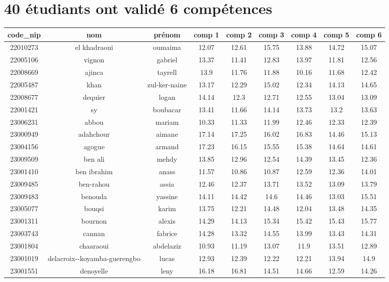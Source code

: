 \documentclass{article}%
\begin{document}
%
\normalsize%
\pagestyle{header}%
\section{40 étudiants ont validé 6 compétences}%
\label{sec:40tudiantsontvalid6comptences}%
\begin{tabular}{|c|c|c|c|c|c|c|c|c|}%
\hline%
\rowcolor{bleu}%
code\_nip&nom&prénom&comp 1&comp 2&comp 3&comp 4&comp 5&comp 6\\%
\hline%
22010273&el khadraoui&oumaima&12.07&12.61&15.75&13.88&14.72&15.07\\%
\hline%
22005106&vignon&gabriel&13.37&11.41&12.83&13.97&11.81&12.56\\%
\hline%
22008669&ajinca&tayrell&13.9&11.76&11.88&10.16&11.68&12.42\\%
\hline%
22005487&khan&zul{-}ker{-}naine&13.17&12.29&15.02&12.34&14.13&14.65\\%
\hline%
22008677&dequier&logan&14.14&12.3&12.71&12.55&13.04&13.09\\%
\hline%
22001421&sy&boubacar&13.41&11.66&14.14&13.73&13.2&13.63\\%
\hline%
23006231&abbou&mariam&10.33&11.33&11.99&12.46&12.33&12.39\\%
\hline%
23000949&adahchour&aimane&17.14&17.25&16.02&16.83&14.46&15.13\\%
\hline%
23004156&agogue&armand&17.23&16.15&15.55&15.38&14.64&14.61\\%
\hline%
23009509&ben ali&mehdy&13.85&12.96&12.54&14.39&13.45&12.36\\%
\hline%
23001410&ben ibrahim&anass&11.57&10.86&10.87&12.59&12.36&14.01\\%
\hline%
23009485&ben{-}rahou&assia&12.46&12.37&13.71&13.52&13.09&13.79\\%
\hline%
23009483&benouda&yassine&14.11&14.42&14.6&14.46&13.03&15.51\\%
\hline%
23005077&bouqsi&karim&13.75&12.21&14.48&12.04&13.48&14.35\\%
\hline%
23001311&bournon&alexis&14.29&14.13&15.34&15.42&15.43&15.77\\%
\hline%
23003743&cannan&fabrice&14.28&13.32&14.55&13.99&13.43&14.31\\%
\hline%
23001804&chaaraoui&abdelaziz&10.93&11.19&13.07&11.9&13.51&12.89\\%
\hline%
23001019&delacroix{-}{-}koyamba{-}guerengbo&lucas&12.93&12.39&12.22&12.21&13.94&14.9\\%
\hline%
23001551&denoyelle&leny&16.18&16.81&14.51&14.66&12.59&14.26\\%

\end{tabular}
\end{document}
